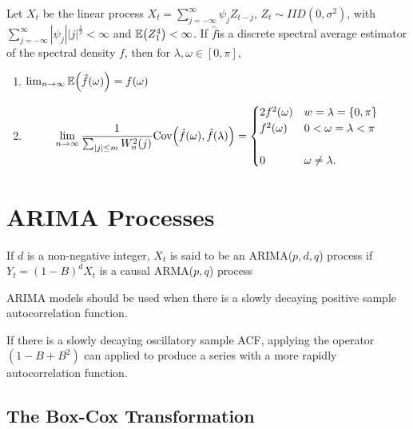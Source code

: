 \begin{thm}
  \label{sec:periodogram-5}
  Let $X_{t}$ be the linear process $X_{t} = \sum_{j=-\infty}^{\infty}
  \psi_{j} Z_{t-j}$, $Z_{t} \sim IID(0, \sigma^{2})$, with
  $\sum_{j=-\infty}^{\infty} |\psi_{j}| |j|^{\frac{1}{2}} < \infty$
  and $\E{Z_{1}^{4}} < \infty$.  If $\hat f$is a discrete spectral
  average estimator of the spectral density $f$, then for $\lambda,
  \omega \in [0, \pi]$,
  \begin{enumerate}
  \item $\lim_{n \rightarrow \infty} \E{\hat f(\omega)} = f(\omega)$
  \item
    \begin{align}
      \label{eq:76}
      \lim_{n \rightarrow \infty} \frac{1}{\sum_{|j| \leq m}^{}
        W_{n}^{2}(j)} \Cov{\hat f(\omega)}{\hat f(\lambda)} =
      \begin{cases}
        2 f^{2}(\omega) & w = \lambda = \{ 0, \pi \} \\
        f^{2}(\omega) & 0 < \omega = \lambda < \pi \\ \\
        0 & \omega \neq \lambda.
      \end{cases}
    \end{align}
  \end{enumerate}
\end{thm}

\section{ARIMA Processes}
\label{sec:arima-processes}

\begin{defn}
  \label{sec:arima-processes-1}
  If $d$ is a non-negative integer, $X_{t}$ is said to be an
  ARIMA($p,d,q$) process if $Y_{t} = (1 - B)^{d} X_{t}$ is a causal
  \textsc{ARMA}($p, q$) process
\end{defn}

\begin{thm}
  \label{sec:arima-processes-2}
  ARIMA models should be used when there is a slowly decaying positive
  sample autocorrelation function.

  If there is a slowly decaying oscillatory  sample ACF, applying
  the operator $(1 - B + B^{2})$ can applied to produce a series with
  a more rapidly autocorrelation function.
\end{thm}

\subsection{The Box-Cox Transformation}
\label{sec:box-cox-transf}

